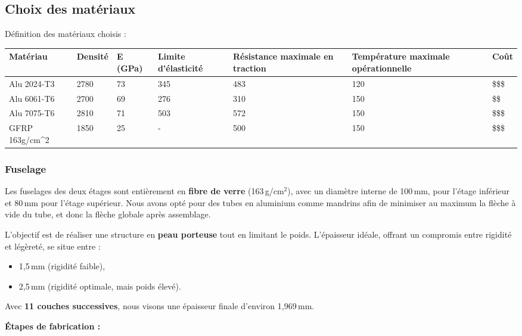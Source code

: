\subsection{Choix des matériaux}

Définition des matériaux choisis :

\begin{table}[h!]
\centering
\begin{tabular}{|p{2cm}|p{1.2cm}|p{1.4cm}|p{2cm}|p{3cm}|p{3cm}|p{1cm}|}
\hline
Matériau & Densité & E (GPa) & Limite d'élasticité & Résistance maximale en traction & Température maximale opérationnelle & Coût \\ \hline
Alu 2024-T3 & 2780 & 73 & 345 & 483 & 120 & \$\$\$ \\ \hline
Alu 6061-T6 & 2700 & 69 & 276 & 310 & 150 & \$\$ \\ \hline
Alu 7075-T6 & 2810 & 71 & 503 & 572 & 150 & \$\$\$ \\ \hline
GFRP 163g/cm^2 & 1850 & 25 & - & 500 & 150 & \$\$\$ \\ \hline
\end{tabular}
\end{table}






\subsubsection{Fuselage}

Les fuselages des deux étages sont entièrement en \textbf{fibre de verre} (163\,g/cm$^2$), avec un diamètre interne de 100\,mm, pour l'étage inférieur et 80\,mm pour l'étage supérieur. Nous avons opté pour des tubes en aluminium comme mandrins afin de minimiser au maximum la flèche à vide du tube, et donc la flèche globale après assemblage.


L'objectif est de réaliser une structure en \textbf{peau porteuse} tout en limitant le poids. L'épaisseur idéale, offrant un compromis entre rigidité et légèreté, se situe entre :
\begin{itemize}
    \item 1,5\,mm (rigidité faible),
    \item 2,5\,mm (rigidité optimale, mais poids élevé).
\end{itemize}

Avec \textbf{11 couches successives}, nous visons une épaisseur finale d'environ 1,969\,mm.

\newpage
\medskip
\noindent
\textbf{Étapes de fabrication :}

